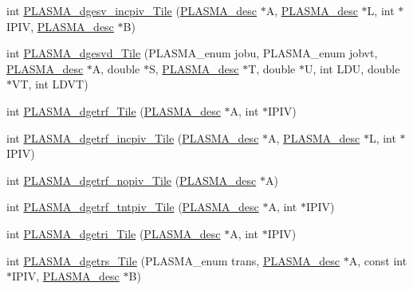 \begin{DoxyCompactItemize}
\item 
int \hyperlink{group__double__Tile_ga157e467687c4ed3a51a28adf392783af_ga157e467687c4ed3a51a28adf392783af}{P\+L\+A\+S\+M\+A\+\_\+dgesv\+\_\+incpiv\+\_\+\+Tile} (\hyperlink{structplasma__desc__t}{P\+L\+A\+S\+M\+A\+\_\+desc} $\ast$A, \hyperlink{structplasma__desc__t}{P\+L\+A\+S\+M\+A\+\_\+desc} $\ast$L, int $\ast$I\+P\+I\+V, \hyperlink{structplasma__desc__t}{P\+L\+A\+S\+M\+A\+\_\+desc} $\ast$B)
\item 
int \hyperlink{group__double__Tile_ga0b7678b8af5b6f5783d5a2dc29bbe9f4_ga0b7678b8af5b6f5783d5a2dc29bbe9f4}{P\+L\+A\+S\+M\+A\+\_\+dgesvd\+\_\+\+Tile} (P\+L\+A\+S\+M\+A\+\_\+enum jobu, P\+L\+A\+S\+M\+A\+\_\+enum jobvt, \hyperlink{structplasma__desc__t}{P\+L\+A\+S\+M\+A\+\_\+desc} $\ast$A, double $\ast$S, \hyperlink{structplasma__desc__t}{P\+L\+A\+S\+M\+A\+\_\+desc} $\ast$T, double $\ast$U, int L\+D\+U, double $\ast$V\+T, int L\+D\+V\+T)
\item 
int \hyperlink{group__double__Tile_ga81f1d06f7d8cb682a15bf6c40c99924c_ga81f1d06f7d8cb682a15bf6c40c99924c}{P\+L\+A\+S\+M\+A\+\_\+dgetrf\+\_\+\+Tile} (\hyperlink{structplasma__desc__t}{P\+L\+A\+S\+M\+A\+\_\+desc} $\ast$A, int $\ast$I\+P\+I\+V)
\item 
int \hyperlink{group__double__Tile_gaedd0aef205165f43d1fec8e2e143dff5_gaedd0aef205165f43d1fec8e2e143dff5}{P\+L\+A\+S\+M\+A\+\_\+dgetrf\+\_\+incpiv\+\_\+\+Tile} (\hyperlink{structplasma__desc__t}{P\+L\+A\+S\+M\+A\+\_\+desc} $\ast$A, \hyperlink{structplasma__desc__t}{P\+L\+A\+S\+M\+A\+\_\+desc} $\ast$L, int $\ast$I\+P\+I\+V)
\item 
int \hyperlink{group__double__Tile_ga7a0926d28d13b960d7c22159ac347248_ga7a0926d28d13b960d7c22159ac347248}{P\+L\+A\+S\+M\+A\+\_\+dgetrf\+\_\+nopiv\+\_\+\+Tile} (\hyperlink{structplasma__desc__t}{P\+L\+A\+S\+M\+A\+\_\+desc} $\ast$A)
\item 
int \hyperlink{group__double__Tile_ga9705a219e533b0fc94698872f67411b0_ga9705a219e533b0fc94698872f67411b0}{P\+L\+A\+S\+M\+A\+\_\+dgetrf\+\_\+tntpiv\+\_\+\+Tile} (\hyperlink{structplasma__desc__t}{P\+L\+A\+S\+M\+A\+\_\+desc} $\ast$A, int $\ast$I\+P\+I\+V)
\item 
int \hyperlink{group__double__Tile_ga7c964736b638ce0fbbb6b679df1af014_ga7c964736b638ce0fbbb6b679df1af014}{P\+L\+A\+S\+M\+A\+\_\+dgetri\+\_\+\+Tile} (\hyperlink{structplasma__desc__t}{P\+L\+A\+S\+M\+A\+\_\+desc} $\ast$A, int $\ast$I\+P\+I\+V)
\item 
int \hyperlink{group__double__Tile_gaa05de453eb3dfe9851d763434948577a_gaa05de453eb3dfe9851d763434948577a}{P\+L\+A\+S\+M\+A\+\_\+dgetrs\+\_\+\+Tile} (P\+L\+A\+S\+M\+A\+\_\+enum trans, \hyperlink{structplasma__desc__t}{P\+L\+A\+S\+M\+A\+\_\+desc} $\ast$A, const int $\ast$I\+P\+I\+V, \hyperlink{structplasma__desc__t}{P\+L\+A\+S\+M\+A\+\_\+desc} $\ast$B)

\end{DoxyCompactItemize}
